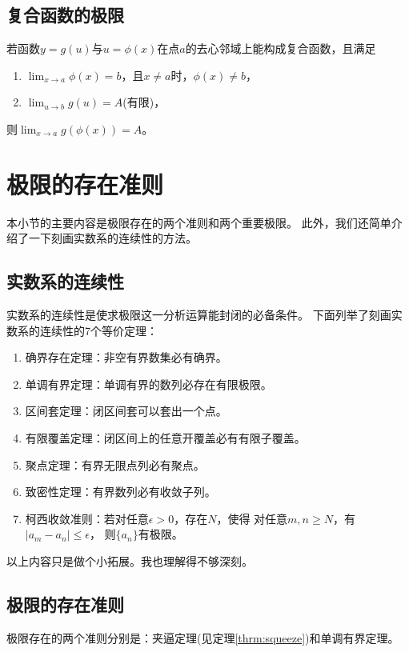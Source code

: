 \subsection{复合函数的极限}
\begin{theorem}[复合函数的极限]
  若函数$y=g(u)$与$u=\phi(x)$在点$a$的去心邻域上能构成复合函数，且满足
  \begin{enumerate}
    \item $\lim_{x\to a}\phi(x)=b$，且$x\neq a$时，$\phi(x)\neq b$，
    \item $\lim_{u\to b}g(u)=A$(有限)，
  \end{enumerate}
  则$\lim_{x\to a}g(\phi(x))=A$。
\end{theorem}

\section{极限的存在准则}
本小节的主要内容是极限存在的两个准则和两个重要极限。
此外，我们还简单介绍了一下刻画实数系的连续性的方法。

\subsection{实数系的连续性}
实数系的连续性是使求极限这一分析运算能封闭的必备条件。
下面列举了刻画实数系的连续性的7个等价定理：
\begin{enumerate}
  \item
  确界存在定理：非空有界数集必有确界。
  \item
  单调有界定理：单调有界的数列必存在有限极限。
  \item
  区间套定理：闭区间套可以套出一个点。
  \item
  有限覆盖定理：闭区间上的任意开覆盖必有有限子覆盖。
  \item
  聚点定理：有界无限点列必有聚点。
  \item
  致密性定理：有界数列必有收敛子列。
  \item
  柯西收敛准则：若对任意$\epsilon > 0$，存在$N$，使得
  对任意$m,n\ge N$，有$|a_m-a_n|\le \epsilon$，
  则$\{a_n\}$有极限。
\end{enumerate}
以上内容只是做个小拓展。我也理解得不够深刻。

\subsection{极限的存在准则}
极限存在的两个准则分别是：夹逼定理(见定理\ref{thrm:squeeze})和单调有界定理。

